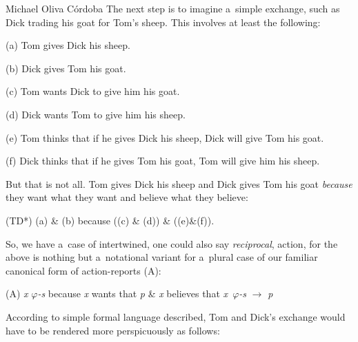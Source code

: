\begin{artengenv}{Michael Oliva Córdoba}
The next step is to imagine a~simple exchange, such as Dick trading his goat for Tom's sheep. This involves at least the following:



\medskip

\noindent (a) Tom gives Dick his sheep.





\noindent (b) Dick gives Tom his goat.





\noindent (c) Tom wants Dick to give him his goat.





\noindent (d) Dick wants Tom to give him his sheep.





\noindent (e) Tom thinks that if he gives Dick his sheep, Dick will give Tom his goat.





\noindent (f) Dick thinks that if he gives Tom his goat, Tom will give him his sheep.


\medskip


\noindent But that is not all. Tom gives Dick his sheep and Dick gives Tom his goat \textit{because} they want what they want and believe what they believe:



\medskip

\noindent (TD*) (a) \& (b) because ((c) \& (d)) \& ((e)\&(f)).



So, we have a~case of intertwined, one could also say \textit{reciprocal}, action, for the above is nothing but a~notational variant for a~plural case of our familiar canonical form of action-reports (A):



\medskip

\noindent (A) \textit{x} \textit{$\varphi $-s} because \textit{x} wants that \textit{p} \& \textit{x} believes that \textit{x~$\varphi $-s} $\to$ \textit{p}



\medskip

According to simple formal language described, Tom and Dick's exchange would have to be rendered more perspicuously as follows:




\end{artengenv}
